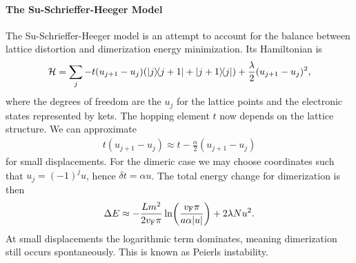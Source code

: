 \paragraph{The Su-Schrieffer-Heeger Model}
The Su-Schrieffer-Heeger model is an attempt to account for the balance between lattice distortion and dimerization energy minimization. Its Hamiltonian is
\begin{align*}
	\mathcal{H} = \sum\limits_{j}-t(u_{j + 1} - u_{j})(\op{j}{j + 1} + \op{j + 1}{j}) + \frac{\lambda}{2}(u_{j + 1} - u_{j})^{2},
\end{align*}
where the degrees of freedom are the $u_{j}$ for the lattice points and the electronic states represented by kets. The hopping element $t$ now depends on the lattice structure. We can approximate
\begin{align*}
	t(u_{j + 1} - u_{j}) \approx t - \frac{\alpha}{2}(u_{j + 1} - u_{j})
\end{align*}
for small displacements. For the dimeric case we may choose coordinates such that $u_{j} = (-1)^{j}u$, hence $\delta t = \alpha u$. The total energy change for dimerization is then
\begin{align*}
	\Delta E\approx -\frac{Lm^{2}}{2v_{\text{F}}\pi}\ln(\frac{v_{\text{F}}\pi}{a\alpha \abs{u}}) + 2\lambda Nu^{2}.
\end{align*}
At small displacements the logarithmic term dominates, meaning dimerization still occurs spontaneously. This is known as Peierls instability.

